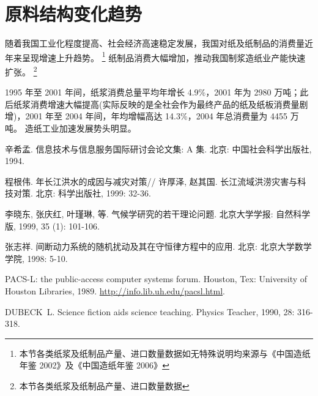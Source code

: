 \documentclass[degree=bachelor]{thuthesis}
\begin{document}
\section{原料结构变化趋势}

随着我国工业化程度提高、社会经济高速稳定发展，我国对纸及纸制品的消费量近年来呈现增速上升趋势。
\footnote{本节各类纸浆及纸制品产量、进口数量数据如无特殊说明均来源与《中国造纸年鉴 2002》及《中国造纸年鉴 2006》}
纸制品消费大幅增加，推动我国制浆造纸业产能快速扩张。
\footnote{本节各类纸浆及纸制品产量、进口数量数据}

1995 年至 2001 年间，纸浆消费总量平均年增长 4.9\%，2001 年为 2980 万吨；此后纸浆消费增速大幅提高(实际反映的是全社会作为最终产品的纸及纸板消费量剧增)，2001 年至 2004 年间，年均增幅高达 14.3\%，2004 年总消费量为 4455 万吨。
造纸工业加速发展势头明显。




\backmatter

\listoffigures
\listoftables

\begin{thebibliography}{6}

辛希孟.
\newblock 信息技术与信息服务国际研讨会论文集: A
  集\allowbreak[C].
\newblock 北京: 中国社会科学出版社, 1994.

程根伟.
  年长江洪水的成因与减灾对策\allowbreak[M]//\allowbreak
许厚泽, 赵其国.
\newblock 长江流域洪涝灾害与科技对策.
\newblock 北京: 科学出版社, 1999: 32-36.

李晓东, 张庆红, 叶瑾琳, 等.
\newblock 气候学研究的若干理论问题\allowbreak[J].
\newblock 北京大学学报: 自然科学版, 1999, 35 (1):
  101-106.

张志祥.
\newblock
  间断动力系统的随机扰动及其在守恒律方程中的应用\allowbreak[D].
\newblock 北京: 北京大学数学学院, 1998: 5-10.

{PACS-L}: the public-access computer systems forum\allowbreak[EB/OL].
\newblock Houston, Tex: University of Houston Libraries,
  1989\allowbreak[1995-05-17].
\newblock \url{http://info.lib.uh.edu/pacsl.html}.

DUBECK~L.
\newblock Science fiction aids science teaching\allowbreak[J].
\newblock Physics Teacher, 1990, 28: 316-318.

\end{thebibliography}
\end{document}

